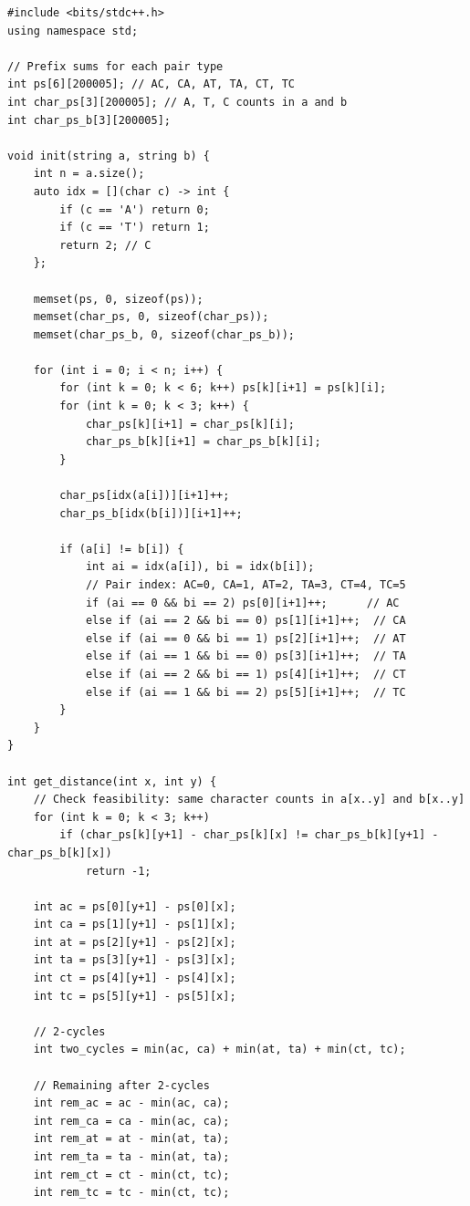 \documentclass[11pt,a4paper]{article}
\begin{document}
\begin{lstlisting}
#include <bits/stdc++.h>
using namespace std;

// Prefix sums for each pair type
int ps[6][200005]; // AC, CA, AT, TA, CT, TC
int char_ps[3][200005]; // A, T, C counts in a and b
int char_ps_b[3][200005];

void init(string a, string b) {
    int n = a.size();
    auto idx = [](char c) -> int {
        if (c == 'A') return 0;
        if (c == 'T') return 1;
        return 2; // C
    };

    memset(ps, 0, sizeof(ps));
    memset(char_ps, 0, sizeof(char_ps));
    memset(char_ps_b, 0, sizeof(char_ps_b));

    for (int i = 0; i < n; i++) {
        for (int k = 0; k < 6; k++) ps[k][i+1] = ps[k][i];
        for (int k = 0; k < 3; k++) {
            char_ps[k][i+1] = char_ps[k][i];
            char_ps_b[k][i+1] = char_ps_b[k][i];
        }

        char_ps[idx(a[i])][i+1]++;
        char_ps_b[idx(b[i])][i+1]++;

        if (a[i] != b[i]) {
            int ai = idx(a[i]), bi = idx(b[i]);
            // Pair index: AC=0, CA=1, AT=2, TA=3, CT=4, TC=5
            if (ai == 0 && bi == 2) ps[0][i+1]++;      // AC
            else if (ai == 2 && bi == 0) ps[1][i+1]++;  // CA
            else if (ai == 0 && bi == 1) ps[2][i+1]++;  // AT
            else if (ai == 1 && bi == 0) ps[3][i+1]++;  // TA
            else if (ai == 2 && bi == 1) ps[4][i+1]++;  // CT
            else if (ai == 1 && bi == 2) ps[5][i+1]++;  // TC
        }
    }
}

int get_distance(int x, int y) {
    // Check feasibility: same character counts in a[x..y] and b[x..y]
    for (int k = 0; k < 3; k++)
        if (char_ps[k][y+1] - char_ps[k][x] != char_ps_b[k][y+1] - char_ps_b[k][x])
            return -1;

    int ac = ps[0][y+1] - ps[0][x];
    int ca = ps[1][y+1] - ps[1][x];
    int at = ps[2][y+1] - ps[2][x];
    int ta = ps[3][y+1] - ps[3][x];
    int ct = ps[4][y+1] - ps[4][x];
    int tc = ps[5][y+1] - ps[5][x];

    // 2-cycles
    int two_cycles = min(ac, ca) + min(at, ta) + min(ct, tc);

    // Remaining after 2-cycles
    int rem_ac = ac - min(ac, ca);
    int rem_ca = ca - min(ac, ca);
    int rem_at = at - min(at, ta);
    int rem_ta = ta - min(at, ta);
    int rem_ct = ct - min(ct, tc);
    int rem_tc = tc - min(ct, tc);


\end{lstlisting}
\end{document}
